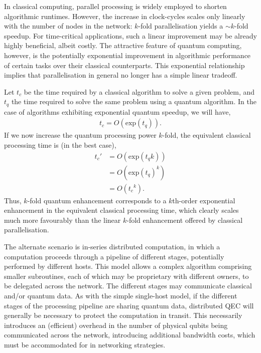 \documentclass[aps, rmp, twocolumn, amsmath, amssymb, nofootinbib, superscriptaddress, longbibliography, floatfix, table-of-contents, eqsecnum]{revtex4-1}
\begin{document}
In classical computing, parallel processing is widely employed to shorten algorithmic runtimes. However, the increase in clock-cycles scales only linearly with the number of nodes in the network: $k$-fold parallelisation yields a \mbox{$\sim k$}-fold speedup. For time-critical applications, such a linear improvement may be already highly beneficial, albeit costly. The attractive feature of quantum computing, however, is the potentially exponential improvement in algorithmic performance of certain tasks over their classical counterparts. This exponential relationship implies that parallelisation in general no longer has a simple linear tradeoff.

Let $t_c$ be the time required by a classical algorithm to solve a given problem, and $t_q$ the time required to solve the same problem using a quantum algorithm. In the case of algorithms exhibiting exponential quantum speedup, we will have,
\begin{align}
t_c = O(\text{exp}(t_q)).
\end{align}
If we now increase the quantum processing power $k$-fold, the equivalent classical processing time is (in the best case),
\begin{align}
t_c' &= O(\text{exp}(t_q k)) \nonumber \\
&= O(\text{exp}(t_q)^{k}) \nonumber \\
&= O({t_c}^{k}).
\end{align}
Thus, $k$-fold quantum enhancement corresponds to a $k$th-order exponential enhancement in the equivalent classical processing time, which clearly scales much more favourably than the linear $k$-fold enhancement offered by classical parallelisation.

The alternate scenario is in-series distributed computation, in which a computation proceeds through a pipeline of different stages, potentially performed by different hosts. This model allows a complex algorithm comprising smaller subroutines, each of which may be proprietary with different owners, to be delegated across the network. The different stages may communicate classical and/or quantum data. As with the simple single-host model, if the different stages of the processing pipeline are sharing quantum data, distributed QEC will generally be necessary to protect the computation in transit. This necessarily introduces an (efficient) overhead in the number of physical qubits being communicated across the network, introducing additional bandwidth costs, which must be accommodated for in networking strategies.
\end{document}
